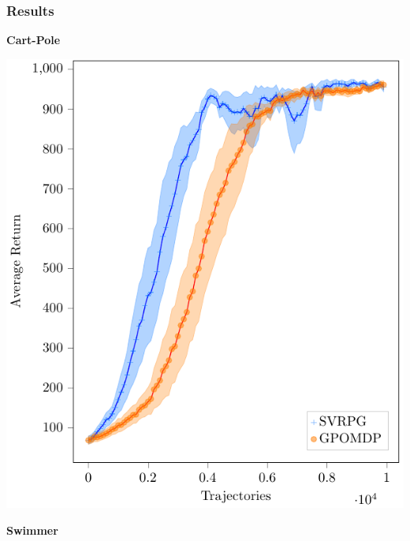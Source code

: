 \documentclass[aspectratio=169]{beamer}
\begin{document}
\begin{frame} 
\frametitle{Results} 


\begin{minipage}[]{.28\paperwidth}
\begin{center}
	\textbf{Cart-Pole}
\end{center}
\includegraphics[width=\textwidth]{images/cartpole.pdf}
\end{minipage}
%
\begin{minipage}[]{.28\paperwidth}
\begin{center}
	\textbf{Swimmer}
\end{center}

\end{minipage}
\end{frame}
\end{document}
